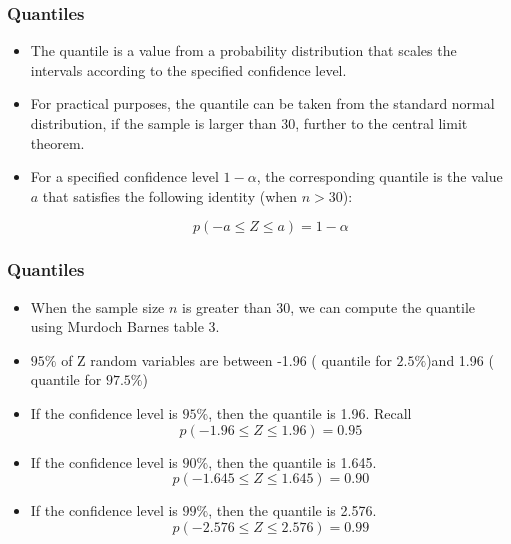 \documentclass[a4]{beamer}
\begin{document}
\begin{frame}
\frametitle{Quantiles }

\begin{itemize}
\item The quantile is a value from a probability distribution that scales the intervals according to the specified confidence level.
\item For practical purposes, the quantile can be taken from the standard normal distribution, if the sample is larger than 30, further to the central limit theorem.
\item For a specified confidence level $1-\alpha $, the corresponding quantile is the value $a$ that satisfies the following identity (when $n > 30$):

    \[ p( -a \leq Z \leq a) = 1- \alpha \]

\end{itemize}

\end{frame}




\begin{frame}
\frametitle{Quantiles}

\begin{itemize} \item When the sample size $n$ is greater than 30, we can compute the quantile using Murdoch Barnes table 3.

\item $95\%$ of Z random variables are between -1.96 ( quantile for $2.5\%$)and 1.96 ( quantile for $97.5\%$)
\end{itemize}

\begin{itemize}
\item If the confidence level is $95\%$, then the quantile is 1.96. Recall
\[ p( -1.96 \leq Z \leq 1.96) = 0.95 \]

\item If the confidence level is $90\%$, then the quantile is 1.645.
\[ p( -1.645 \leq Z \leq 1.645) = 0.90 \]

\item If the confidence level is $99\%$, then the quantile is 2.576.
\[ p( -2.576 \leq Z \leq 2.576) = 0.99 \]

\end{itemize}



\end{frame}
\end{document}
